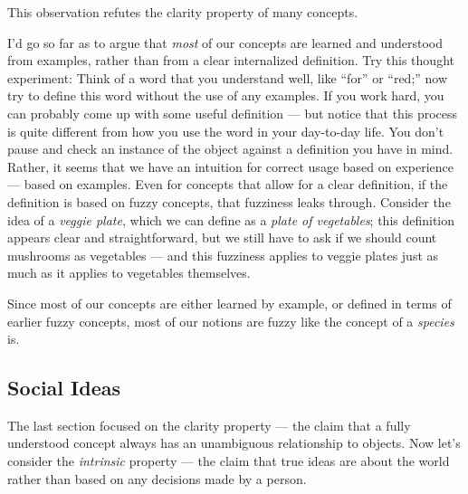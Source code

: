 \documentclass[11pt, oneside]{article}
\begin{document}
This observation refutes the clarity property of many concepts.

I'd go so far as to argue that {\em most} of our concepts are learned and
understood from examples, rather than from a clear internalized definition.
Try this thought experiment: Think of a word that you understand well, like
``for'' or ``red;'' now try to define this word without the use of any examples.
If you work hard, you can probably come up with some useful definition --- but
notice that this process is quite different from how you use the word in your
day-to-day life. You don't pause and check an instance of the object against a
definition you have in mind. Rather, it seems that we have an intuition for
correct usage based on experience --- based on examples.
Even for concepts that allow for a clear definition, if the definition is based
on fuzzy concepts, that fuzziness leaks through. Consider the idea of a {\em
veggie plate}, which we can define as a {\em plate of vegetables}; this
definition appears clear and straightforward, but we still have to ask if we
should count mushrooms as vegetables --- and this fuzziness applies to veggie
plates just as much as it applies to vegetables themselves.

Since most of our concepts are either learned by example, or defined in terms of
earlier fuzzy concepts,
most of our notions are fuzzy like the concept of a {\em species} is.

\subsection{Social Ideas}

%
%

The last section focused on the clarity property --- the claim that a fully
understood
concept always has an unambiguous relationship to objects.
Now let's
consider the {\em intrinsic} property --- the claim that true ideas are about
the world
rather
than based on any decisions made by a person.
\end{document}
